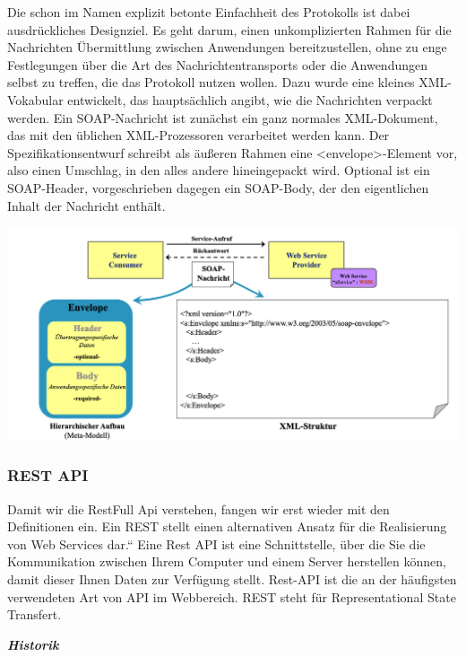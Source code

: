 Die schon im Namen explizit betonte Einfachheit des Protokolls ist dabei ausdrückliches Designziel. Es geht darum, einen unkomplizierten Rahmen für die Nachrichten Übermittlung zwischen Anwendungen bereitzustellen, ohne zu enge Festlegungen über die Art des Nachrichtentransports oder die Anwendungen selbst zu treffen, die das Protokoll nutzen wollen. Dazu wurde eine kleines XML-Vokabular entwickelt, das hauptsächlich angibt, wie die Nachrichten verpackt werden. Ein SOAP-Nachricht ist zunächst ein ganz normales XML-Dokument, das mit den üblichen XML-Prozessoren verarbeitet werden kann. Der Spezifikationsentwurf schreibt als äußeren Rahmen eine <envelope>-Element vor, also einen Umschlag, in den alles andere hineingepackt wird. Optional ist ein SOAP-Header, vorgeschrieben dagegen ein SOAP-Body, der den eigentlichen Inhalt der Nachricht enthält.\cite{helmut529_30}

\begin{center}
\includegraphics[scale=.4]{images/Struktur_ein_SOAP}
\end{center}

\subsubsection{REST API}
Damit wir die RestFull Api verstehen, fangen wir erst wieder mit den Definitionen ein.
Ein REST stellt einen alternativen Ansatz für die Realisierung von Web Services dar.“ Eine Rest API ist eine Schnittstelle, über die Sie die Kommunikation zwischen Ihrem Computer und einem Server herstellen können, damit dieser Ihnen Daten zur Verfügung stellt. Rest-API ist die an der häufigsten verwendeten Art von API im Webbereich. REST steht für Representational State Transfert.\cite{alda}

\textit{\textbf{Historik}}


